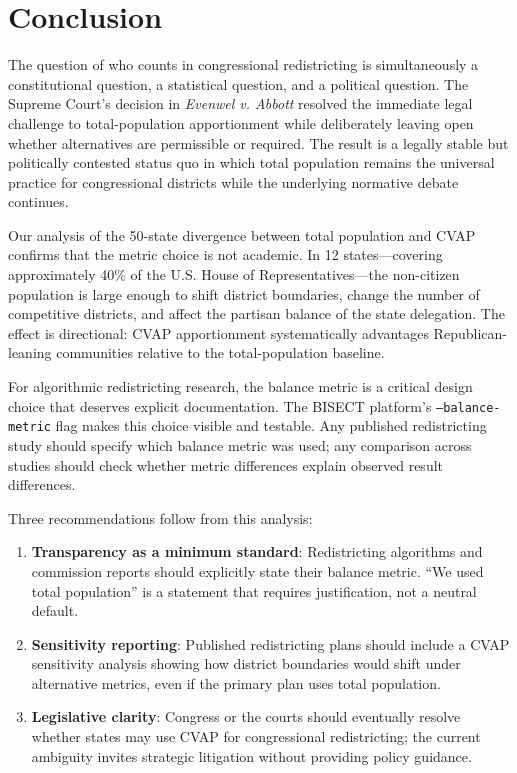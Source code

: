 \section{Conclusion}
\label{sec:conclusion}

The question of who counts in congressional redistricting is simultaneously a constitutional question, a statistical question, and a political question. The Supreme Court's decision in \emph{Evenwel v. Abbott} resolved the immediate legal challenge to total-population apportionment while deliberately leaving open whether alternatives are permissible or required. The result is a legally stable but politically contested status quo in which total population remains the universal practice for congressional districts while the underlying normative debate continues.

Our analysis of the 50-state divergence between total population and CVAP confirms that the metric choice is not academic. In 12 states---covering approximately 40\% of the U.S. House of Representatives---the non-citizen population is large enough to shift district boundaries, change the number of competitive districts, and affect the partisan balance of the state delegation. The effect is directional: CVAP apportionment systematically advantages Republican-leaning communities relative to the total-population baseline.

For algorithmic redistricting research, the balance metric is a critical design choice that deserves explicit documentation. The BISECT platform's \texttt{--balance-metric} flag makes this choice visible and testable. Any published redistricting study should specify which balance metric was used; any comparison across studies should check whether metric differences explain observed result differences.

Three recommendations follow from this analysis:

\begin{enumerate}
    \item \textbf{Transparency as a minimum standard}: Redistricting algorithms and commission reports should explicitly state their balance metric. ``We used total population'' is a statement that requires justification, not a neutral default.
    \item \textbf{Sensitivity reporting}: Published redistricting plans should include a CVAP sensitivity analysis showing how district boundaries would shift under alternative metrics, even if the primary plan uses total population.
    \item \textbf{Legislative clarity}: Congress or the courts should eventually resolve whether states may use CVAP for congressional redistricting; the current ambiguity invites strategic litigation without providing policy guidance.
\end{enumerate}

